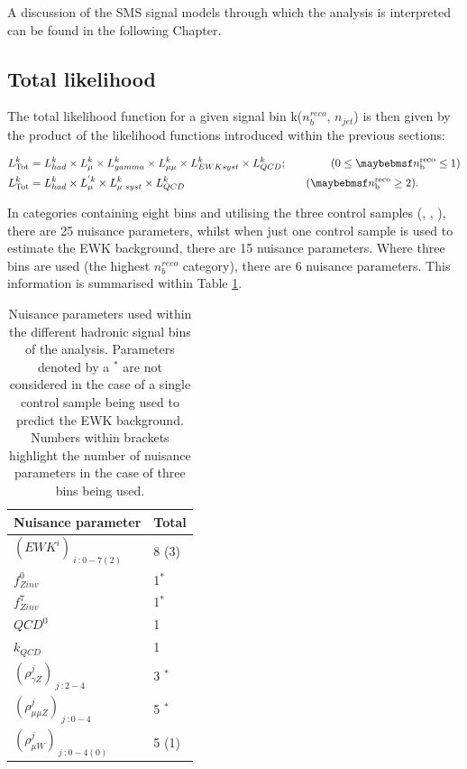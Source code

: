 A discussion of the \ac{SMS} signal models through which the analysis is interpreted can be found in the following Chapter. 

\subsection{Total likelihood}
\label{subsec:totallikelihood}

The total likelihood function for a given signal bin k($n_{b}^{reco}$, $n_{jet}$) is then given by the product of the likelihood functions introduced within the previous sections:

\begin{align}
L^{k}_{\text{Tot}} &= L^{k}_{had} \times  L^{k}_{\mu} \times  L^{k}_{\gamma} \times  L^{k}_{\mu\mu} \times  L^{k}_{EWK syst} \times  L^{k}_{QCD};  \qquad\qquad (0 \leq \nbreco \leq 1) \nonumber \\
L^{k}_{\text{Tot}} &= L^{k}_{had} \times  L^{'\xspace k }_{\mu} \times  L^{k}_{\mu\text{ }syst} \times  L^{k}_{QCD} \quad\qquad\qquad\qquad\qquad\qquad(\nbreco \geq 2).
\end{align}

In categories containing eight \theht bins and utilising the three control samples (\mupjets, \dimupjets, \gpjets), there are 25 nuisance parameters, whilst when just one control sample is used to estimate the \ac{EWK} background, there are 15 nuisance parameters. Where three \theht bins are used (the highest $n_{b}^{reco}$ category), there are 6 nuisance parameters. This information is summarised within Table \ref{tab:nuisanceparameters}.

 \begin{table}[h!]
 \footnotesize
\begin{center}
\begin{tabular*}{0.45\textwidth}{@{\extracolsep{\fill}}ll}
\hline
Nuisance parameter & Total \\
\hline\hline
$(EWK^{i})_{\ i\ : 0-7(2)}$ & 8 (3) \\
$f^{0}_{Zinv}$  & 1$^{*}$ \\
 $f^{7}_{Zinv}$  &1$^{*}$ \\
 $QCD^{0}$ & 1 \\
 $k_{QCD}$ & 1 \\
 $(\rho^{j}_{\gamma Z})_{\ j \ : 2-4}$  & 3 $^{*}$\\
 $(\rho^{j}_{\mu\mu Z})_{\ j \ : 0-4}$   & 5 $^{*}$ \\
 $(\rho^{j}_{\mu W})_{\ j \ : 0-4(0)}$ & 5 (1) \\
\end{tabular*}
\end{center}
\caption[Nuisance parameters used within the different hadronic signal bins of the analysis]{Nuisance parameters used within the different hadronic signal bins of the analysis. Parameters denoted by a $^{*}$ are not considered in the case of a single control sample being used to predict the \ac{EWK} background. Numbers within brackets highlight the number of nuisance parameters in the case of three \theht bins being used.}\label{tab:nuisanceparameters}
\end{table}

